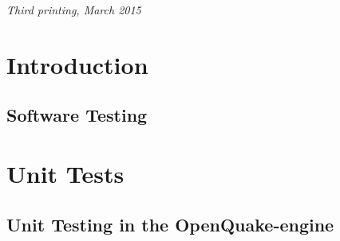 \documentclass[11pt,fleqn]{book} %
\begin{document}
\noindent \textit{Third printing, March 2015} %


\pagestyle{empty} %
\tableofcontents %
\cleardoublepage %
\pagestyle{fancy} %

% 


\part{Introduction}

\chapter{Software Testing}
   \label{chap:intro}
   

\thispagestyle{empty}
\part{Unit Tests}

\chapter{Unit Testing in the OpenQuake-engine}
   \label{chap:unit-tests}
   
   \cleardoublepage
\end{document}

